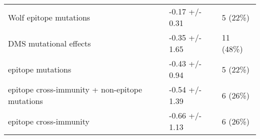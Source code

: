 \begin{tabular}{lll}
                          Wolf epitope mutations &                                -0.17 +/- 0.31 &                             5 (22\%) \\
                          DMS mutational effects &                                -0.35 +/- 1.65 &                            11 (48\%) \\
                               epitope mutations &                                -0.43 +/- 0.94 &                             5 (22\%) \\
  epitope cross-immunity + non-epitope mutations &                                -0.54 +/- 1.39 &                             6 (26\%) \\
                          epitope cross-immunity &                                -0.66 +/- 1.13 &                             6 (26\%) \\
\bottomrule
\end{tabular}
